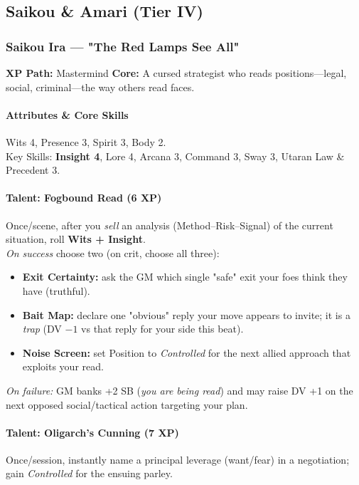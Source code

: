 

\subsection{Saikou \& Amari (Tier IV)}

\subsubsection{Saikou Ira — "The Red Lamps See All"}
\textbf{XP Path:} Mastermind \quad
\textbf{Core:} A cursed strategist who reads positions—legal, social, criminal—the way others read faces.

\paragraph{Attributes \& Core Skills}
Wits 4, Presence 3, Spirit 3, Body 2.\\
Key Skills: \textbf{Insight 4}, Lore 4, Arcana 3, Command 3, Sway 3, Utaran Law \& Precedent 3.

\paragraph{Talent: Fogbound Read (6 XP)}
Once/scene, after you \emph{sell} an analysis (Method–Risk–Signal) of the current situation, roll \textbf{Wits + Insight}.\\
\emph{On success} choose two (on crit, choose all three):
\begin{itemize}
  \item \textbf{Exit Certainty:} ask the GM which single "safe" exit your foes think they have (truthful).
  \item \textbf{Bait Map:} declare one "obvious" reply your move appears to invite; it is a \emph{trap} (DV $-1$ vs that reply for your side this beat).
  \item \textbf{Noise Screen:} set Position to \emph{Controlled} for the next allied approach that exploits your read.
\end{itemize}
\emph{On failure:} GM banks +2 SB (\emph{you are being read}) and may raise DV +1 on the next opposed social/tactical action targeting your plan.

\paragraph{Talent: Oligarch's Cunning (7 XP)}
Once/session, instantly name a principal leverage (want/fear) in a negotiation; gain \emph{Controlled} for the ensuing parley.

